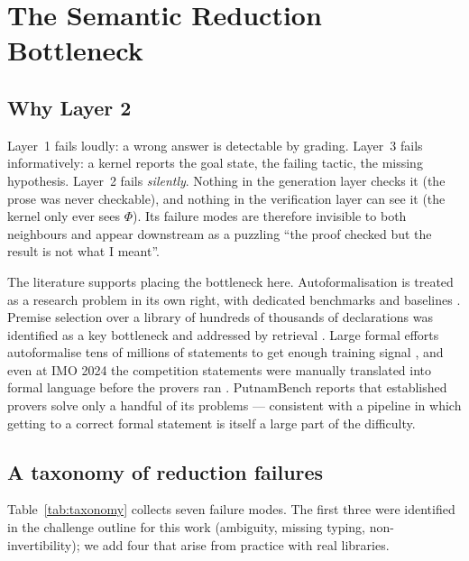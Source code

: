 \documentclass[11pt,a4paper]{article}
\theoremstyle{plain}
\theoremstyle{remark}
\begin{document}
\section{The Semantic Reduction Bottleneck}
\label{sec:bottleneck}

\subsection{Why Layer 2}

Layer~1 fails loudly: a wrong answer is detectable by grading.  Layer~3 fails
informatively: a kernel reports the goal state, the failing tactic, the missing
hypothesis.  Layer~2 fails \emph{silently}.  Nothing in the generation layer
checks it (the prose was never checkable), and nothing in the verification
layer can see it (the kernel only ever sees $\Phi$).  Its failure modes are
therefore invisible to both neighbours and appear downstream as a puzzling
``the proof checked but the result is not what I meant''.

The literature supports placing the bottleneck here.  Autoformalisation is
treated as a research problem in its own right, with dedicated benchmarks and
baselines \cite{azerbayev2023proofnet}.  Premise selection over a library of
hundreds of thousands of declarations was identified as a key bottleneck and
addressed by retrieval \cite{yang2023leandojo}.  Large formal efforts
autoformalise tens of millions of statements to get enough training signal
\cite{hubert2025alphaproof}, and even at IMO 2024 the competition statements were
manually translated into formal language before the provers ran
\cite{hubert2025alphaproof}.  PutnamBench reports that established provers solve
only a handful of its problems \cite{tsoukalas2024putnambench} --- consistent
with a pipeline in which getting to a correct formal statement is itself a
large part of the difficulty.

\subsection{A taxonomy of reduction failures}

Table~\ref{tab:taxonomy} collects seven failure modes.  The first three were
identified in the challenge outline for this work (ambiguity, missing typing,
non-invertibility); we add four that arise from practice with real libraries.
\end{document}
